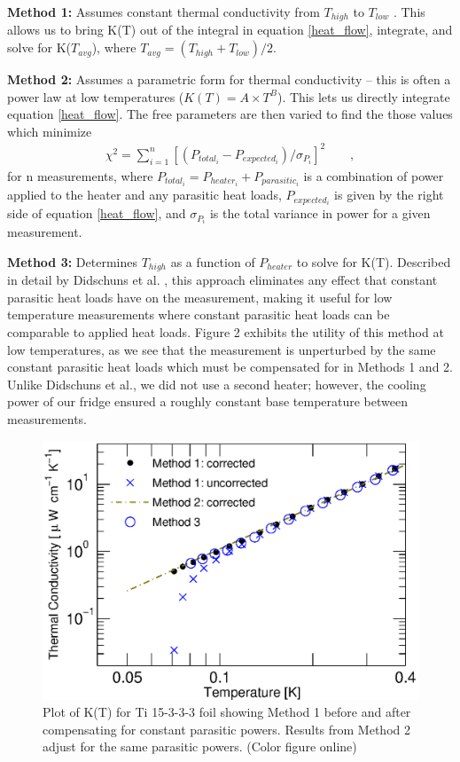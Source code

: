 \documentclass[final]{svjour2}
\begin{document}
\textbf{Method 1:} Assumes constant thermal conductivity from $T_{high}$ to $T_{low}$ \footnotemark {}. This allows us to bring K(T) out of the integral in equation \ref{heat_flow}, integrate, and solve for K($T_{avg}$), where $T_{avg} = (T_{high} + T_{low})/2$.

\textbf{Method 2:} Assumes a parametric form for thermal conductivity -- this is often a power law at low temperatures ($K(T) = A \times T^B$). This lets us directly integrate equation \ref{heat_flow}. The free parameters are then varied to find the those values which minimize
\begin{eqnarray}
\chi^2 = \sum_{i = 1}^{n} \left[(P_{total_i} - P_{expected_i})/\sigma_{P_i}\right]^2 \qquad ,
\label{param}
\end{eqnarray}
for n measurements, where $P_{total_i} = P_{heater_i} + P_{parasitic_i}$ is a combination of power applied to the heater and any parasitic heat loads, $P_{expected_i}$ is given by the right side of equation \ref{heat_flow}, and $\sigma_{P_i}$ is the total variance in power for a given measurement.

\textbf{Method 3:} Determines $T_{high}$ as a function of $P_{heater}$ to solve for K(T). Described in detail by Didschuns et al. \cite{Didschuns2003}, this approach eliminates any effect that constant parasitic heat loads have on the measurement, making it useful for low temperature measurements where constant parasitic heat loads can be comparable to applied heat loads. Figure 2 exhibits the utility of this method at low temperatures, as we see that the measurement is unperturbed by the same constant parasitic heat loads which must be compensated for in Methods 1 and 2. Unlike Didschuns et al., we did not use a second heater; however, the cooling power of our fridge ensured a roughly constant base temperature between measurements.

\begin{figure}[h]
\centering
\includegraphics[width = 0.6\columnwidth]{Ti153_methods.eps}
\caption{{\small Plot of K(T) for Ti 15-3-3-3 foil showing Method 1 before and after compensating for constant parasitic powers. Results from Method 2 adjust for the same parasitic powers. (Color figure online)}}
\label{ti153_method}
\end{figure}
\end{document}
